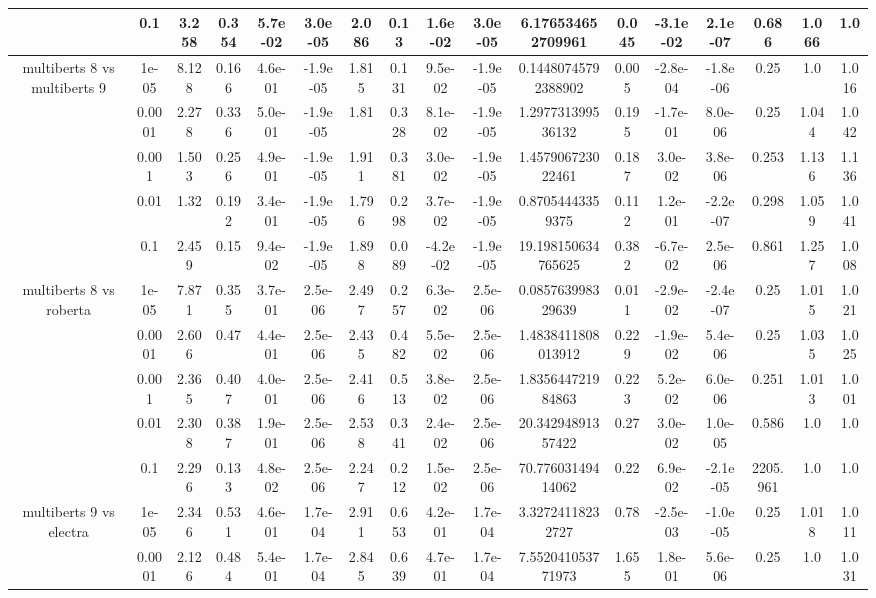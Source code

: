 \begin{tabular}{|c|c|c|c|c|c|c|c|c|c|c|c|c|c|c|c|c|}
 & 0.1 & 3.258 & 0.354 & 5.7e-02 & 3.0e-05 & 2.086 & 0.13 & 1.6e-02 & 3.0e-05 & 6.176534652709961 & 0.045 & -3.1e-02 & 2.1e-07 & 0.686 & 1.066 & 1.0 \\
\hline
\multirow{5}{*}{multiberts 8 vs multiberts 9} & 1e-05 & 8.128 & 0.166 & 4.6e-01 & -1.9e-05 & 1.815 & 0.131 & 9.5e-02 & -1.9e-05 & 0.14480745792388902 & 0.005 & -2.8e-04 & -1.8e-06 & 0.25 & 1.0 & 1.016 \\
 & 0.0001 & 2.278 & 0.336 & 5.0e-01 & -1.9e-05 & 1.81 & 0.328 & 8.1e-02 & -1.9e-05 & 1.297731399536132 & 0.195 & -1.7e-01 & 8.0e-06 & 0.25 & 1.044 & 1.042 \\
 & 0.001 & 1.503 & 0.256 & 4.9e-01 & -1.9e-05 & 1.911 & 0.381 & 3.0e-02 & -1.9e-05 & 1.457906723022461 & 0.187 & 3.0e-02 & 3.8e-06 & 0.253 & 1.136 & 1.136 \\
 & 0.01 & 1.32 & 0.192 & 3.4e-01 & -1.9e-05 & 1.796 & 0.298 & 3.7e-02 & -1.9e-05 & 0.87054443359375 & 0.112 & 1.2e-01 & -2.2e-07 & 0.298 & 1.059 & 1.041 \\
 & 0.1 & 2.459 & 0.15 & 9.4e-02 & -1.9e-05 & 1.898 & 0.089 & -4.2e-02 & -1.9e-05 & 19.198150634765625 & 0.382 & -6.7e-02 & 2.5e-06 & 0.861 & 1.257 & 1.008 \\
\hline
\multirow{5}{*}{multiberts 8 vs roberta } & 1e-05 & 7.871 & 0.355 & 3.7e-01 & 2.5e-06 & 2.497 & 0.257 & 6.3e-02 & 2.5e-06 & 0.085763998329639 & 0.011 & -2.9e-02 & -2.4e-07 & 0.25 & 1.015 & 1.021 \\
 & 0.0001 & 2.606 & 0.47 & 4.4e-01 & 2.5e-06 & 2.435 & 0.482 & 5.5e-02 & 2.5e-06 & 1.4838411808013912 & 0.229 & -1.9e-02 & 5.4e-06 & 0.25 & 1.035 & 1.025 \\
 & 0.001 & 2.365 & 0.407 & 4.0e-01 & 2.5e-06 & 2.416 & 0.513 & 3.8e-02 & 2.5e-06 & 1.835644721984863 & 0.223 & 5.2e-02 & 6.0e-06 & 0.251 & 1.013 & 1.001 \\
 & 0.01 & 2.308 & 0.387 & 1.9e-01 & 2.5e-06 & 2.538 & 0.341 & 2.4e-02 & 2.5e-06 & 20.34294891357422 & 0.27 & 3.0e-02 & 1.0e-05 & 0.586 & 1.0 & 1.0 \\
 & 0.1 & 2.296 & 0.133 & 4.8e-02 & 2.5e-06 & 2.247 & 0.212 & 1.5e-02 & 2.5e-06 & 70.77603149414062 & 0.22 & 6.9e-02 & -2.1e-05 & 2205.961 & 1.0 & 1.0 \\
\hline
\multirow{5}{*}{multiberts 9 vs electra } & 1e-05 & 2.346 & 0.531 & 4.6e-01 & 1.7e-04 & 2.911 & 0.653 & 4.2e-01 & 1.7e-04 & 3.32724118232727 & 0.78 & -2.5e-03 & -1.0e-05 & 0.25 & 1.018 & 1.011 \\
 & 0.0001 & 2.126 & 0.484 & 5.4e-01 & 1.7e-04 & 2.845 & 0.639 & 4.7e-01 & 1.7e-04 & 7.552041053771973 & 1.655 & 1.8e-01 & 5.6e-06 & 0.25 & 1.0 & 1.031 \\

\end{tabular}
